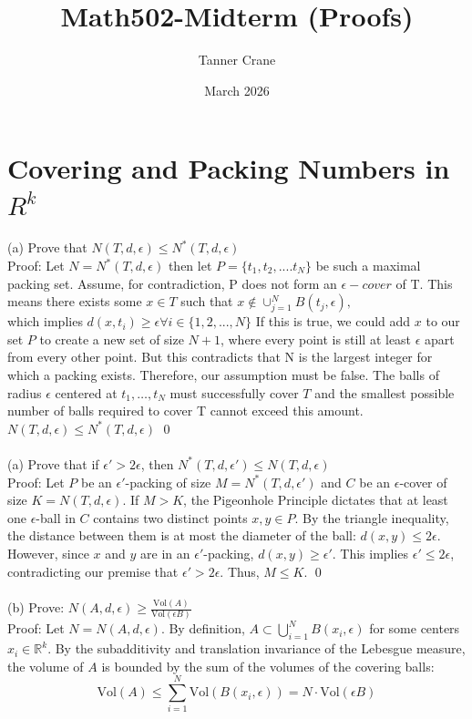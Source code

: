 \documentclass{article}
\title{Math502-Midterm (Proofs)}
\author{Tanner Crane}
\date{March 2026}
\begin{document}
\maketitle

\section{Covering and Packing Numbers in $R^k$}
(a) Prove that $N(T, d, \epsilon) \le N^*(T, d, \epsilon)$ 
\\
Proof: Let $N = N^*(T, d, \epsilon)$ then let $P = \{ t_1, t_2, .... t_N \}$ be such a maximal packing set. Assume, for contradiction, P does not form an $\epsilon-cover$ of T. This means there exists some $x \in T$ such that $ x \notin \cup_{j=1}^{N} B(t_j,\epsilon),$
\\
which implies $d(x,t_i) \geq \epsilon \forall i \in \{ 1, 2, ..., N\} $ If this is true, we could add $x$ to our set $P$ to create a new set of size $N + 1$, where every point is still at least $\epsilon$ apart from every other point. But this contradicts that N is the largest integer for which a packing exists. Therefore, our assumption must be false. The balls of radius $\epsilon$ centered at $t_1, \dots, t_N$ must successfully cover $T$ and the smallest possible number of balls required to cover T cannot exceed this amount. 
\\
$N(T, d, \epsilon) \le N^*(T, d, \epsilon)$ \qed 
\\
\\
(a) Prove that if $\epsilon' > 2\epsilon$, then $N^*(T, d, \epsilon') \le N(T, d, \epsilon)$
\\
Proof: Let $P$ be an $\epsilon'$-packing of size $M = N^*(T, d, \epsilon')$ and $C$ be an $\epsilon$-cover of size $K = N(T, d, \epsilon)$. If $M > K$, the Pigeonhole Principle dictates that at least one $\epsilon$-ball in $C$ contains two distinct points $x, y \in P$. By the triangle inequality, the distance between them is at most the diameter of the ball: $d(x, y) \leq 2\epsilon$. However, since $x$ and $y$ are in an $\epsilon'$-packing, $d(x, y) \geq \epsilon'$. This implies $\epsilon' \leq 2\epsilon$, contradicting our premise that $\epsilon' > 2\epsilon$. Thus, $M \leq K$.
\qed
\\
\\
(b) Prove: $N(A, d, \epsilon) \geq \frac{\text{Vol}(A)}{\text{Vol}(\epsilon B)}$
\\
Proof: Let $N = N(A, d, \epsilon)$. By definition, $A \subset \bigcup_{i=1}^N B(x_i, \epsilon)$ for some centers $x_i \in \mathbb{R}^k$. By the subadditivity and translation invariance of the Lebesgue measure, the volume of $A$ is bounded by the sum of the volumes of the covering balls:$$\text{Vol}(A) \leq \sum_{i=1}^N \text{Vol}(B(x_i, \epsilon)) = N \cdot \text{Vol}(\epsilon B)$$
\end{document}
